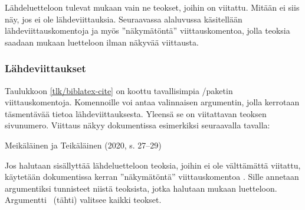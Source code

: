 Lähdeluetteloon tulevat mukaan vain ne teokset, joihin on viitattu.
Mitään ei siis näy, jos ei ole lähdeviittauksia. Seuraavassa alaluvussa
käsitellään lähdeviittauskomentoja ja myös ''näkymätöntä''
viittauskomentoa, jolla teoksia saadaan mukaan luetteloon ilman näkyvää
viittausta.

\subsubsection{Lähdeviittaukset}


Taulukkoon \ref{tlk/biblatex-cite} on koottu tavallisimpia
\-/paketin viittauskomentoja. Komennoille voi antaa
valinnaisen argumentin, jolla kerrotaan täsmentävää tietoa
lähdeviittauksesta. Yleensä se on viitattavan teoksen sivunumero.
Viittaus näkyy dokumentissa esimerkiksi seuraavalla tavalla:

\begin{koodilohkosis}
\textcite[27--29]{johdatus} %
\end{koodilohkosis}

\begin{tulossis}
  Meikäläinen ja Teikäläinen (2020, s. 27--29)
\end{tulossis}

Jos halutaan sisällyttää lähdeluetteloon teoksia, joihin ei ole
välttämättä viitattu, käytetään dokumentissa kerran ''näkymätöntä''
viittauskomentoa . Sille annetaan argumentiksi
tunnisteet niistä teoksista, jotka halutaan mukaan luetteloon.
Argumentti~\koodi{*} (tähti) valitsee kaikki teokset.

\begin{koodilohkosis}
\nocite{meikäläinen, teikäläinen} %
\nocite{*}                        %
\end{koodilohkosis}

